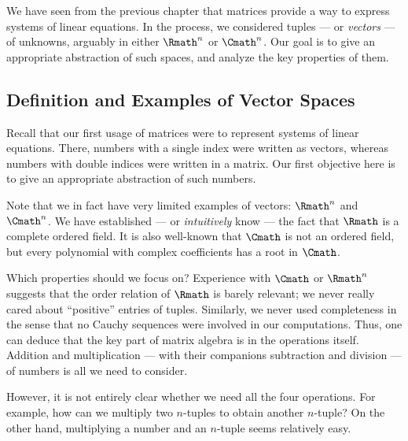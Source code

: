 \label{sec:vectorspace}

We have seen from the previous chapter that
matrices provide a way to express systems of linear equations.
In the process, we considered tuples
--- or \emph{vectors} ---
of unknowns, arguably in either \(\Rmath^n\) or \(\Cmath^n\).
Our goal is to give an appropriate abstraction of such spaces,
and analyze the key properties of them.

\subsection[Definition and Examples]%
    {Definition and Examples of Vector Spaces}
\label{sbc:vspdef}

Recall that our first usage of matrices
were to represent systems of linear equations.
There, numbers with a single index were written as vectors,
whereas numbers with double indices were written in a matrix.
Our first objective here
is to give an appropriate abstraction of such numbers.

\begin{example}
    \label{exm:vspintro}
    Note that we in fact have very limited examples of vectors:
    \(\Rmath^n\) and \(\Cmath^n\).
    We have established
    --- or \emph{intuitively} know ---
    the fact that \(\Rmath\) is a complete ordered field.
    It is also well-known that
    \(\Cmath\) is not an ordered field,
    but every polynomial with complex coefficients
    has a root in \(\Cmath\).

    Which properties should we focus on?
    Experience with \(\Cmath\) or \(\Rmath^n\) suggests that
    the order relation of \(\Rmath\) is barely relevant;
    we never really cared about ``positive'' entries of tuples.
    Similarly, we never used completeness in the sense that
    no Cauchy sequences were involved in our computations.
    Thus, one can deduce that
    the key part of matrix algebra is in the operations itself.
    Addition and multiplication
    --- with their companions subtraction and division ---
    of numbers is all we need to consider.

    However, it is not entirely clear whether
    we need all the four operations.
    For example, how can we multiply two \(n\)-tuples
    to obtain another \(n\)-tuple?
    On the other hand,
    multiplying a number and an \(n\)-tuple seems relatively easy.
\end{example}

